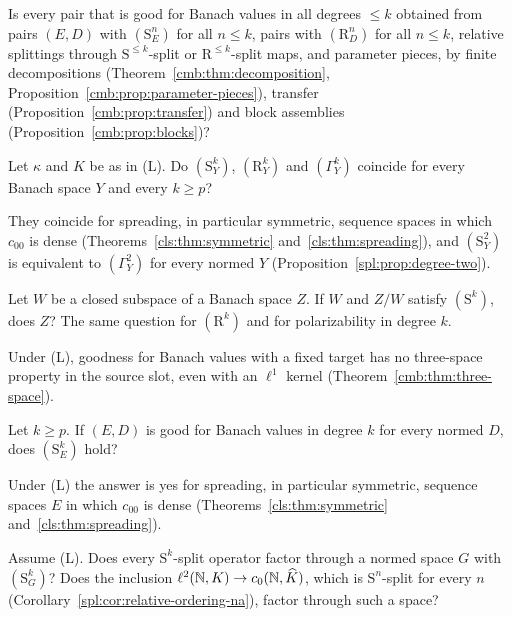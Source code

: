 \begin{question}\label{q:quest:generation}
Is every pair that is good for Banach values in all degrees $\le k$ obtained from pairs $(E,D)$ with $(\mathrm S^n_E)$
for all $n\le k$, pairs with $(\mathrm R^n_D)$ for all $n\le k$, relative splittings through $\mathrm S^{\le k}$-split or
$\mathrm R^{\le k}$-split maps, and parameter pieces, by finite decompositions (Theorem~\ref{cmb:thm:decomposition},
Proposition~\ref{cmb:prop:parameter-pieces}), transfer (Proposition~\ref{cmb:prop:transfer}) and block assemblies
(Proposition~\ref{cmb:prop:blocks})?
\end{question}

\begin{question}\label{q:quest:coincide}
Let $\kappa$ and $K$ be as in \textup{(L)}. Do $(\mathrm S^k_Y)$, $(\mathrm R^k_Y)$ and $(\Gamma^k_Y)$ coincide for every
Banach space $Y$ and every $k\ge p$?
\end{question}

They coincide for spreading, in particular symmetric, sequence spaces in which $c_{00}$ is dense
(Theorems~\ref{cls:thm:symmetric} and~\ref{cls:thm:spreading}), and
$(\mathrm S^2_Y)$ is equivalent to $(\Gamma^2_Y)$ for every normed $Y$ (Proposition~\ref{spl:prop:degree-two}).

\begin{question}\label{q:quest:three-space}
Let $W$ be a closed subspace of a Banach space $Z$. If $W$ and $Z/W$ satisfy $(\mathrm S^k)$, does $Z$? The same question
for $(\mathrm R^k)$ and for polarizability in degree $k$.
\end{question}

Under \textup{(L)}, goodness for Banach values with a fixed target has no three-space property in the source slot, even
with an $\ell^1$ kernel (Theorem~\ref{cmb:thm:three-space}).

\begin{question}\label{q:quest:source-split}
Let $k\ge p$. If $(E,D)$ is good for Banach values in degree $k$ for every normed $D$, does $(\mathrm S^k_E)$ hold?
\end{question}

Under \textup{(L)} the answer is yes for spreading, in particular symmetric, sequence spaces $E$ in which $c_{00}$ is
dense (Theorems~\ref{cls:thm:symmetric} and~\ref{cls:thm:spreading}).

\begin{question}\label{q:quest:factorization}
Assume \textup{(L)}. Does every $\mathrm S^k$-split operator factor through a normed space $G$ with $(\mathrm S^k_G)$? Does
the inclusion $\ell^2(\mathbb N,K)\to c_0(\mathbb N,\widehat K)$, which is $\mathrm S^n$-split for every $n$
(Corollary~\ref{spl:cor:relative-ordering-na}), factor through such a space?
\end{question}

